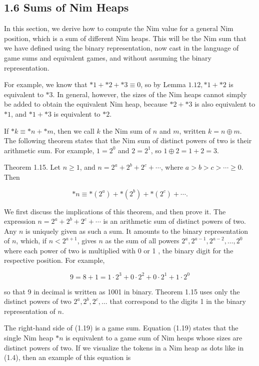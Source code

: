 \documentclass[12pt]{article}
\begin{document}
\subsection*{1.6 Sums of Nim Heaps}
In this section, we derive how to compute the Nim value for a general Nim position, which is a sum of different Nim heaps. This will be the Nim sum that we have defined using the binary representation, now cast in the language of game sums and equivalent games, and without assuming the binary representation.

For example, we know that $* 1+* 2+* 3 \equiv 0$, so by Lemma $1.12, * 1+* 2$ is equivalent to $* 3$. In general, however, the sizes of the Nim heaps cannot simply be added to obtain the equivalent Nim heap, because $* 2+* 3$ is also equivalent to $* 1$, and $* 1+* 3$ is equivalent to $* 2$.

If $* k \equiv * n+* m$, then we call $k$ the Nim sum of $n$ and $m$, written $k=n \oplus m$. The following theorem states that the Nim sum of distinct powers of two is their arithmetic sum. For example, $1=2^{0}$ and $2=2^{1}$, so $1 \oplus 2=1+2=3$.

Theorem 1.15. Let $n \geq 1$, and $n=2^{a}+2^{b}+2^{c}+\cdots$, where $a>b>c>\cdots \geq 0$. Then


\begin{equation*}
* n \equiv *\left(2^{a}\right)+*\left(2^{b}\right)+*\left(2^{c}\right)+\cdots . \tag{1.19}
\end{equation*}


We first discuss the implications of this theorem, and then prove it. The expression $n=2^{a}+2^{b}+2^{c}+\cdots$ is an arithmetic sum of distinct powers of two. Any $n$ is uniquely given as such a sum. It amounts to the binary representation of $n$, which, if $n<2^{a+1}$, gives $n$ as the sum of all powers $2^{a}, 2^{a-1}, 2^{a-2}, \ldots, 2^{0}$ where each power of two is multiplied with 0 or 1 , the binary digit for the respective position. For example,

$$
9=8+1=1 \cdot 2^{3}+0 \cdot 2^{2}+0 \cdot 2^{1}+1 \cdot 2^{0}
$$

so that 9 in decimal is written as 1001 in binary. Theorem 1.15 uses only the distinct powers of two $2^{a}, 2^{b}, 2^{c}, \ldots$ that correspond to the digits 1 in the binary representation of $n$.

The right-hand side of (1.19) is a game sum. Equation (1.19) states that the single Nim heap $* n$ is equivalent to a game sum of Nim heaps whose sizes are distinct powers of two. If we visualize the tokens in a Nim heap as dots like in (1.4), then an example of this equation is
\end{document}
